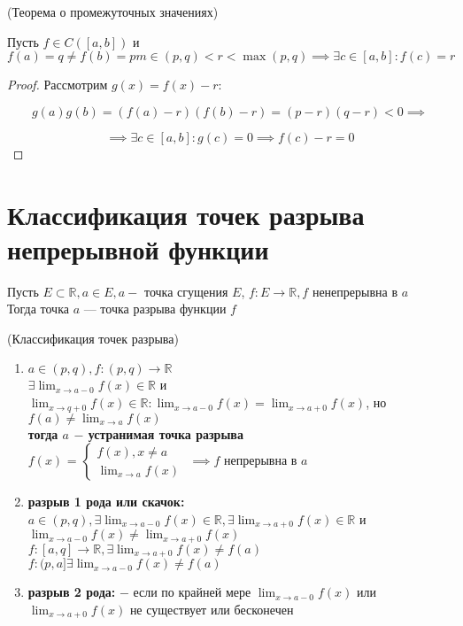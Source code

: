 \begin{theorem} (Теорема о промежуточных значениях)
    
    Пусть $f \in C([a,b])$ и $f(a) = q \neq f(b) = p m\in(p,q) < r < \max (p,q) \implies \exists c \in [a,b]: f(c) = r$
    
\end{theorem}

\begin{proof}
    Рассмотрим $g(x) = f(x) - r:$
    
    $$g(a)g(b) = (f(a)-r)(f(b)-r) = (p-r)(q-r) < 0 \implies$$

    $$\implies \exists c \in [a,b]: g(c) = 0 \implies f(c) -r = 0$$
\end{proof}

\section{Классификация точек разрыва непрерывной функции}

\begin{definition}
    Пусть $E \subset \mathbb{R}, a \in E, a -$ точка сгущения $E$, $f: E \to \mathbb{R}, f$ ненепрерывна в $a$\\
    Тогда точка $a$ --- точка разрыва функции  $f$
\end{definition}

\begin{properties} (Классификация точек разрыва)
    \begin{enumerate}
        \item $a \in (p,q), f: (p,q) \to \mathbb{R}$\\
            $\exists \displaystyle\lim_{x \to a-0} f(x) \in \mathbb{R}$ и $\displaystyle\lim_{x \to q+0} f(x) \in \mathbb{R}: \displaystyle\lim_{x \to a-0} f(x) = \displaystyle\lim_{x \to a+0} f(x)$, но $f(a) \neq \displaystyle\lim_{x \to a} f(x)$\\
            \textbf{тогда $a$ $-$ устранимая точка разрыва}\\
            $f(x)$ =
            $\begin{cases}
                f(x), x \neq a\\
                \displaystyle\lim_{x \to a} f(x)
            \end{cases}$
            $\implies f$ непрерывна в $a$ 
        \item \textbf{разрыв 1 рода или скачок:} $a \in (p,q), \exists \displaystyle\lim_{x \to a-0} f(x) \in \mathbb{R}, \exists \displaystyle\lim_{x \to a + 0} f(x) \in \mathbb{R}$ и $\displaystyle\lim_{x \to a-0} f(x) \neq \displaystyle\lim_{x \to a+0} f(x)$\\
            $f: [a,q] \to \mathbb{R}, \exists \displaystyle\lim_{x \to a+0} f(x) \neq f(a)$\\
            $f: (p,a] \exists \displaystyle\lim_{x \to a-0} f(x) \neq f(a)$\\
        \item \textbf{разрыв 2 рода:} $-$ если по крайней мере $\displaystyle\lim_{x \to a-0}f(x)$ или $\displaystyle\lim_{x \to a+0} f(x)$ не существует или бесконечен
    \end{enumerate}
\end{properties}

